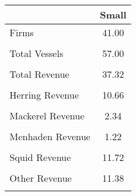 \begin{tabular}{l*{1}{c}}
\hline\hline
                &    Small\\
\hline
Firms           &    41.00\\
                &         \\
Total Vessels   &    57.00\\
                &         \\
Total Revenue   &    37.32\\
                &         \\
Herring Revenue &    10.66\\
                &         \\
Mackerel Revenue&     2.34\\
                &         \\
Menhaden Revenue&     1.22\\
                &         \\
Squid Revenue   &    11.72\\
                &         \\
Other Revenue   &    11.38\\
                &         \\
\hline\hline
\end{tabular}

